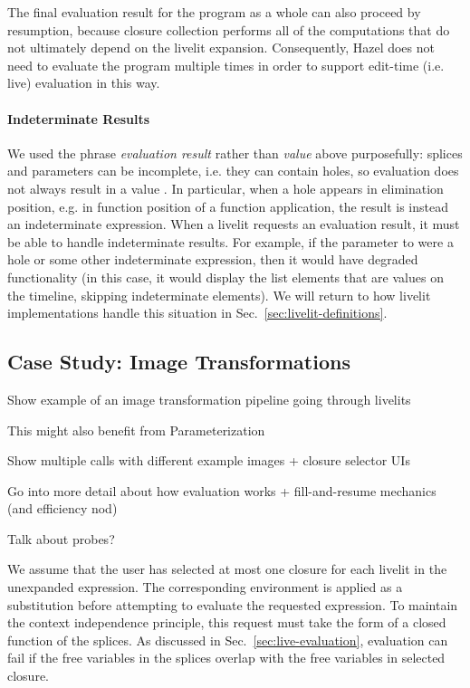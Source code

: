 The final evaluation result for the program as a whole can also proceed by resumption, because
closure collection performs all of the computations that do not ultimately depend on the livelit expansion.
Consequently, Hazel does not need to evaluate the program multiple times in order to support edit-time
(i.e. live) evaluation in this way.

\paragraph{Indeterminate Results}
We used the phrase \emph{evaluation result} rather than \emph{value} above purposefully:
splices and parameters can be incomplete, i.e. they can contain holes, so
evaluation does not always result in a value \cite{HazelnutLive}.
In particular, when a hole appears in elimination position, e.g. in function position of a function application,
 the result is instead an indeterminate expression.
When a livelit requests an evaluation result, it must be able to handle indeterminate results.
For example, if the parameter to  were a hole or some other indeterminate expression,
then it would have degraded functionality
(in this case, it would display the list elements that are values on the timeline, skipping indeterminate elements).
We will return to how livelit implementations handle this situation in Sec.~\ref{sec:livelit-definitions}.

\subsection{Case Study: Image Transformations}\label{sec:image-transformation}
Show example of an image transformation pipeline going through livelits

This might also benefit from Parameterization

Show multiple calls with different example images + closure selector UIs

Go into more detail about how evaluation works + fill-and-resume mechanics (and efficiency nod)

Talk about probes?

We assume that the user has selected at most one closure for each livelit in the unexpanded expression.
The corresponding environment is applied as a substitution before attempting to evaluate the requested expression.
To maintain the context independence principle, this request must take the form of a closed function
of the splices.
As discussed in Sec.~\ref{sec:live-evaluation}, evaluation can fail if the free variables in the splices
overlap with the free variables in selected closure.

